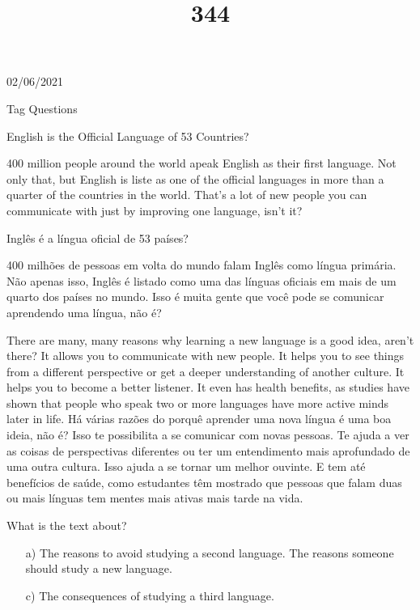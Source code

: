 \documentclass{SchoolBook}
\begin{document}
    \begin{day}{02/06/2021}
        \title{3}{Tag Questions}
        
        \begin{multicols}{2}
            \title{4}{English is the Official Language of 53 Countries?}
            
            400 million people around the world apeak English as their first language. Not only that, but English is liste as one of the official languages in more than a quarter of the countries in the world. That's a lot of new people you can communicate with just by improving one language, isn't it?
            \vfill\columnbreak
            \title{4}{Inglês é a língua oficial de 53 países?}
            
            400 milhões de pessoas em volta do mundo falam Inglês como língua primária. Não apenas isso, Inglês é listado como uma das línguas oficiais em mais de um quarto dos países no mundo. Isso é muita gente que você pode se comunicar aprendendo uma língua, não é?
        \end{multicols}
        
        \begin{multicols}{2}
            There are many, many reasons why learning a new language is a good idea, aren't there? It allows you to communicate with new people. It helps you to see things from a different perspective or get a deeper understanding of another culture. It helps you to become a better listener. It even has health benefits, as studies have shown that people who speak two or more languages have more active minds later in life.
            \vfill\columnbreak
            Há várias razões do porquê aprender uma nova língua é uma boa ideia, não é? Isso te possibilita a se comunicar com novas pessoas. Te ajuda a ver as coisas de perspectivas diferentes ou ter um entendimento mais aprofundado de uma outra cultura. Isso ajuda a se tornar um melhor ouvinte. E tem até benefícios de saúde, como estudantes têm mostrado que pessoas que falam duas ou mais línguas tem mentes mais ativas mais tarde na vida.
        \end{multicols}
        
        \begin{enumerate}
            \itemc[1.] What is the text about? \normalfont
            \begin{enumerate}[nosep]
                \item[a)] The reasons to avoid studying a second language.
                 The reasons someone should study a new language.
                \item[c)] The consequences of studying a third language.
            \end{enumerate}
            

\end{enumerate}
\end{day}
\end{document}
